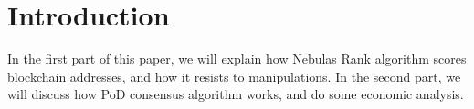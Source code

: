 \section{Introduction}

In the first part of this paper, we will explain how Nebulas Rank algorithm scores blockchain addresses, and how it resists to manipulations. In the second part, we will discuss how PoD consensus algorithm works, and do some economic analysis.
